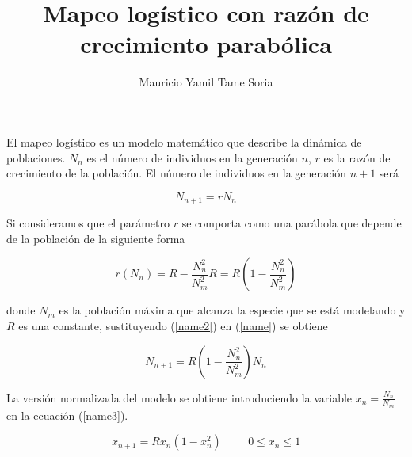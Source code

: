 \documentclass[9pt]{article}
\begin{document}
\title{Mapeo log\'istico con raz\'on de crecimiento parab\'olica}
\author{Mauricio Yamil Tame Soria}	
\maketitle
	
El mapeo log\'istico es un modelo matem\'atico que describe la din\'amica de poblaciones. $N_n$ es el n\'umero de individuos en la 
generaci\'on $n$, $r$ es la raz\'on de crecimiento de la poblaci\'on. El n\'umero de individuos en la generaci\'on $n+1$ ser\'a 

\begin{equation}
N_{n+1}=rN_n
\label{name}
\end{equation}
	
Si consideramos que el par\'ametro $r$ se comporta como una par\'abola que depende de la poblaci\'on 
de la siguiente forma

\begin{figure}[h!]
\begin{center}
	
\end{center}
\end {figure}	

\begin{equation}
r(N_n)=R-\frac{N_n^2}{N_m^2}R=R(1-\frac{N_n^2}{N_m^2})
\label{name2}
\end{equation} 

donde $N_m$ es la poblaci\'on m\'axima que alcanza la especie que se est\'a modelando 
y $R$ es una constante, sustituyendo (\ref{name2}) en (\ref{name}) se obtiene
	
\begin{equation}
N_{n+1}=R(1-\frac{N_n^2}{N_m^2})N_n
\label{name3}
\end{equation}
	
La versi\'on normalizada del modelo se obtiene introduciendo la variable $x_n=\frac{N_n}{N_m}$ en la
ecuaci\'on (\ref{name3}).
	
\begin{equation}
x_{n+1}=Rx_n(1-x_n^2) \hspace{1cm} 0\leq x_n\leq1
\label{name4}
\end{equation}
	
\end{document}
